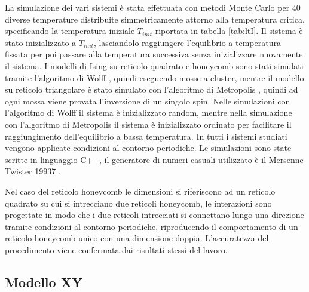 \documentclass{article}
\begin{document}
La simulazione dei vari sistemi è stata effettuata con metodi Monte Carlo per $40$ diverse temperature distribuite simmetricamente attorno alla temperatura critica, specificando la temperatura iniziale $T_{init}$ riportata in tabella \ref{tab:ltI}.
Il sistema è stato inizializzato a $T_{init}$, lasciandolo raggiungere l'equilibrio a temperatura fissata per poi passare alla temperatura successiva senza inizializzare nuovamente il sistema.
I modelli di Ising su reticolo quadrato e honeycomb sono stati simulati tramite l'algoritmo di Wolff \cite{wolff}, quindi eseguendo mosse a cluster, mentre il modello su reticolo triangolare è stato simulato con l'algoritmo di Metropolis \cite{metropolis}, quindi ad ogni mossa viene provata l'inversione di un singolo spin.
Nelle simulazioni con l'algoritmo di Wolff il sistema è inizializzato random, mentre nella simulazione con l'algoritmo di Metropolis il sistema è inizializzato ordinato per facilitare il raggiungimento dell'equilibrio a bassa temperatura.
In tutti i sistemi studiati vengono applicate condizioni al contorno periodiche.
Le simulazioni sono state scritte in linguaggio C++, il generatore di numeri casuali utilizzato è il Mersenne Twister 19937 \cite{mersenne}.

Nel caso del reticolo honeycomb le dimensioni si riferiscono ad un reticolo quadrato su cui si intrecciano due reticoli honeycomb, le interazioni sono progettate in modo che i due reticoli intrecciati si connettano lungo una direzione tramite condizioni al contorno periodiche, riproducendo il comportamento di un reticolo honeycomb unico con una dimensione doppia.
L'accuratezza del procedimento viene confermata dai risultati stessi del lavoro.

\subsection{Modello XY}
\end{document}
